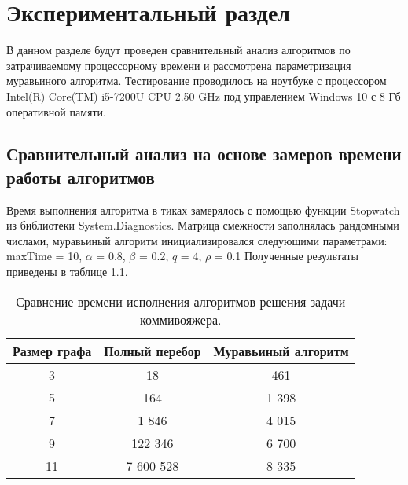 \chapter{Экспериментальный раздел}
\label{cha:research}
    В данном разделе будут проведен  
    сравнительный анализ алгоритмов по затрачиваемому процессорному 
    времени и рассмотрена параметризация муравьиного алгоритма.
    Тестирование проводилось на ноутбуке с процессором
    Intel(R) Core(TM) i5-7200U CPU 2.50 GHz \cite{processor-i5-7200u}
    под управлением Windows 10 с 8 Гб оперативной памяти.

    \section{Сравнительный анализ на основе замеров времени работы алгоритмов}
        Время выполнения алгоритма в тиках замерялось с помощью функции Stopwatch \cite{csharp-stopwatch}
        из библиотеки System.Diagnostics.
        Матрица смежности заполнялась рандомными числами,
        муравьиный алгоритм инициализировался следующими параметрами:
        maxTime = 10, $\alpha$ = 0.8, $\beta$ = 0.2, $q$ = 4, $\rho$ = 0.1
        Полученные результаты приведены в таблице \ref{table:test:time}.
        
        \begin{table}[h!]
            \begin{center}
                \begin{tabular}{|c|c|c|}
                    \hline
                    Размер графа & Полный перебор & Муравьиный алгоритм \\ \hline
                    3            & 18             & 461             \\ \hline
                    5            & 164            & 1 398           \\ \hline
                    7            & 1 846          & 4 015           \\ \hline
                    9            & 122 346        & 6 700           \\ \hline
                    11           & 7 600 528      & 8 335           \\ 
                    \hline
                \end{tabular}
            \end{center}
            \caption{Сравнение времени исполнения алгоритмов решения задачи коммивояжера.}
            \label{table:test:time}
        \end{table}      
        
